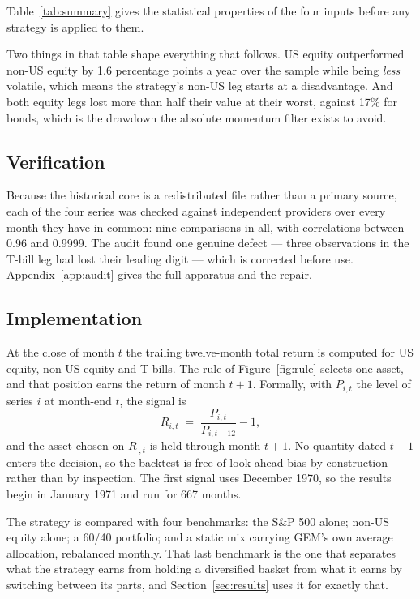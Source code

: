 \documentclass[11pt,a4paper]{article}
\begin{document}
\begin{table}[H]
  \centering
  \caption{Summary statistics of the four input series.}
  \label{tab:summary}
  
\end{table}

Table~\ref{tab:summary} gives the statistical properties of the four inputs
before any strategy is applied to them.

Two things in that table shape everything that follows. US equity outperformed
non-US equity by 1.6 percentage points a year over the sample while being
\emph{less} volatile, which means the strategy's non-US leg starts at a
disadvantage. And both equity legs lost more than half their value at their
worst, against 17\% for bonds, which is the drawdown the absolute momentum
filter exists to avoid.

\subsection{Verification}

Because the historical core is a redistributed file rather than a primary
source, each of the four series was checked against independent providers over
every month they have in common: nine comparisons in all, with correlations
between 0.96 and 0.9999. The audit found one genuine defect --- three
observations in the T-bill leg had lost their leading digit --- which is
corrected before use. Appendix~\ref{app:audit} gives the full apparatus and the
repair.

\subsection{Implementation}

At the close of month $t$ the trailing twelve-month total return is computed for
US equity, non-US equity and T-bills. The rule of Figure~\ref{fig:rule} selects
one asset, and that position earns the return of month $t+1$. Formally, with
$P_{i,t}$ the level of series $i$ at month-end $t$, the signal is
\[
  R_{i,t} \;=\; \frac{P_{i,t}}{P_{i,t-12}} - 1 ,
\]
and the asset chosen on $R_{\cdot,t}$ is held through month $t+1$. No quantity
dated $t+1$ enters the decision, so the backtest is free of look-ahead bias by
construction rather than by inspection. The first signal uses December 1970, so
the results begin in January 1971 and run for 667 months.

The strategy is compared with four benchmarks: the S\&P 500 alone; non-US
equity alone; a 60/40 portfolio; and a static mix carrying GEM's own average
allocation, rebalanced monthly. That last benchmark is the one that separates
what the strategy earns from holding a diversified basket from what it earns by
switching between its parts, and Section~\ref{sec:results} uses it for exactly
that.
\end{document}
